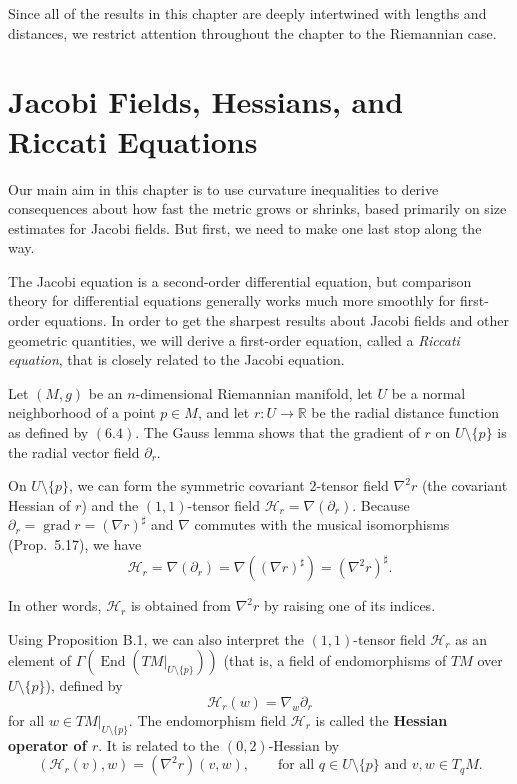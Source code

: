 Since all of the results in this chapter are deeply intertwined with lengths and distances, we restrict attention throughout the chapter to the Riemannian case.

\section{Jacobi Fields, Hessians, and Riccati Equations}

Our main aim in this chapter is to use curvature inequalities to derive consequences about how fast the metric grows or shrinks, based primarily on size estimates for Jacobi fields. But first, we need to make one last stop along the way.

The Jacobi equation is a second-order differential equation, but comparison theory for differential equations generally works much more smoothly for first-order equations. In order to get the sharpest results about Jacobi fields and other geometric quantities, we will derive a first-order equation, called a \emph{Riccati equation}, that is closely related to the Jacobi equation.

Let $(M,g)$ be an $n$-dimensional Riemannian manifold, let $U$ be a normal neighborhood of a point $p \in M$, and let $r: U \to \mathbb{R}$ be the radial distance function as defined by $(6.4)$. The Gauss lemma shows that the gradient of $r$ on $U \setminus \{p\}$ is the radial vector field $\partial_r$.

On $U \setminus \{p\}$, we can form the symmetric covariant $2$-tensor field $\nabla^2 r$ (the covariant Hessian of $r$) and the $(1,1)$-tensor field $\mathcal{H}_r = \nabla(\partial_r)$. Because $\partial_r = \operatorname{grad} r = (\nabla r)^{\sharp}$ and $\nabla$ commutes with the musical isomorphisms (Prop.~5.17), we have
\[
\mathcal{H}_r = \nabla(\partial_r) = \nabla((\nabla r)^{\sharp}) = (\nabla^2 r)^{\sharp}.
\]

In other words, $\mathcal{H}_r$ is obtained from $\nabla^2 r$ by raising one of its indices.

Using Proposition B.1, we can also interpret the $(1,1)$-tensor field $\mathcal{H}_r$ as an element of $\Gamma(\operatorname{End}(TM|_{U \setminus \{p\}}))$ (that is, a field of endomorphisms of $TM$ over $U \setminus \{p\}$), defined by
\begin{equation}
\mathcal{H}_r(w) = \nabla_w \partial_r
\tag{11.1}
\end{equation}
for all $w \in TM|_{U \setminus \{p\}}$. The endomorphism field $\mathcal{H}_r$ is called the \textbf{Hessian operator of $r$}. It is related to the $(0,2)$-Hessian by
\begin{equation}
(\mathcal{H}_r(v), w) = (\nabla^2 r)(v, w),
\qquad \text{for all } q \in U \setminus \{p\} \text{ and } v, w \in T_q M.
\tag{11.2}
\end{equation}

